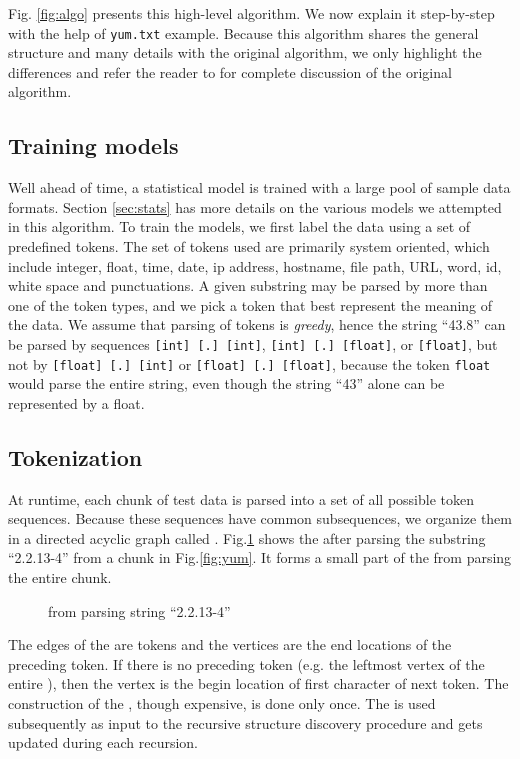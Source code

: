 Fig. \ref{fig:algo} presents this high-level algorithm. We now explain
it step-by-step with the help of {\tt yum.txt} example.
Because this algorithm shares the general structure and many details with
the original algorithm, we only highlight the differences and
refer the reader to \cite{fisher+:dirttoshovels} for complete discussion of
the original algorithm.

\subsection{Training models}
Well ahead of time, a statistical model is trained with
a large pool of sample data formats. Section \ref{sec:stats} has more details
on the various models we attempted in this algorithm. To train the models,
we first label the data using a set of predefined tokens. The set of tokens
used are primarily system oriented, which include
integer, float, time, date, ip address, hostname, file path, URL, 
word, id, white space and punctuations. 
A given substring may be parsed by more than one of the token
types, and we pick a token that best represent the meaning of the data.
We assume that parsing of tokens is {\em greedy}, hence
the string ``43.8'' can be parsed by sequences 
{\tt [int] [.] [int]}, {\tt [int] [.] [float]}, or {\tt [float]},
but not by {\tt [float] [.] [int]} or {\tt [float] [.] [float]},
because the token {\tt float} would parse the entire string, even though
the string ``43'' alone can be represented by a float.

\subsection{Tokenization}
At runtime, each chunk of test data is parsed into a set of all possible 
token sequences. Because these sequences have
common subsequences, we organize them in a directed acyclic graph
called \seqset. Fig.\ref{fig:seqset} shows the \seqset{} after parsing 
the substring ``2.2.13-4'' from a chunk in Fig.\ref{fig:yum}. It 
forms a small part of the \seqset{} from parsing the entire chunk.

\begin{figure}[th]
\begin{center}
\end{center}
\caption{\seqset{} from parsing string ``2.2.13-4''}\label{fig:seqset}
\end{figure}

The edges of the \seqset{} are tokens and the vertices are the end locations
of the preceding token. If there is no preceding token (e.g. the leftmost
vertex of the entire \seqset), then the vertex is the begin location 
of first character of next token.
The construction of the \seqset, though expensive, is done only once.
The \seqset{} is used subsequently as input to the recursive 
structure discovery procedure and gets updated during each recursion.

